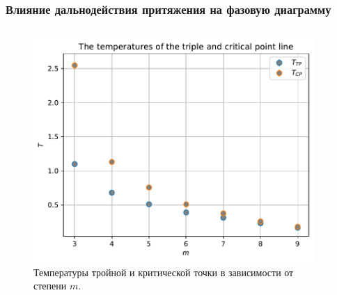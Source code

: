 \documentclass[pdf,hyperref={unicode}]{beamer}
\begin{document}
\begin{frame}
\transdissolve[duration=0.2]
\frametitle{Влияние дальнодействия притяжения на фазовую диаграмму}


\begin{columns}

\begin{column}{0.47\linewidth}

\begin{figure}[h]
\begin{center}
\includegraphics[width=\textwidth]{temperatures_triple_critical_Widom}
\caption{ \tiny Температуры тройной и критической точки в зависимости от степени $m$.}
\label{risTcpTtp}
\end{center}
\end{figure}

\end{column}

\begin{column}{0.47\linewidth}


\end{column}
\end{columns}
\end{frame}
\end{document}
